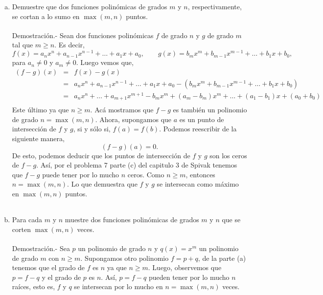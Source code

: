 \begin{enumerate}[\bfseries 1.]
\begin{enumerate}[(a)]
	    \item Demuestre que dos funciones polinómicas de grados $m$ y $n$, respectivamente, se cortan a lo sumo en $\max(m,n)$ puntos.\\\\
		Demostración.-\; Sean dos funciones polinómicas $f$ de grado $n$ y $g$ de grado $m$ tal que $m\geq n$. Es decir,
		$$f(x)=a_nx^n+a_{n-1}x^{n-1}+\ldots + a_1x+a_0, \qquad g(x)=b_mx^m + b_{m-1}x^{m-1}+\ldots + b_1x+b_0,$$
		para $a_n\neq 0$ y $a_m\neq 0$. Luego vemos que,
		$$\begin{array}{rcl}
		    (f-g)(x) &=& f(x)-g(x)\\
			     &=& a_nx^n+a_{n-1}x^{n-1}+\ldots + a_1x+a_0 - \left(b_mx^m + b_{m-1}x^{m-1}+\ldots + b_1x+b_0\right)\\
			     &=& a_nx^n + \ldots +a_{m+1}x^{m+1} - b_mx^m + (a_m-b_m)x^m+\ldots + (a_1-b_1)x+(a_0+b_0)\\
		\end{array}$$
		Este  último ya que $n\geq m.$ Acá mostramos que $f-g$ es también un polinomio de grado $n=\max(m,n)$. Ahora, supongamos que $a$ es un punto de intersección de $f$ y $g$, si y sólo si, $f(a)=f(b)$. Podemos reescribir de la siguiente manera,
		$$(f-g)(a)=0.$$
		De esto, podemos deducir que los puntos de intersección de $f$ y $g$ son los ceros de $f-g$. Así, por el problema 7 parte (c) del capitulo 3 de Spivak tenemos que $f-g$ puede tener por lo mucho $n$ ceros. Como $n\geq m$, entonces $n=\max(m,n)$. Lo que demuestra que $f$ y $g$ se intersecan como máximo en $\max(m,n)$ puntos.\\\\
		

	    \item Para cada $m$ y $n$ muestre dos funciones polinómicas de grados $m$ y $n$ que se corten $\max(m,n)$ veces.\\\\
		Demostración.-\; Sea $p$ un polinomio de grado $n$ y $q(x)=x^m$ un polinomio de grado $m$ con $n\geq m$. Supongamos otro polinomio $f=p+q$, de la parte (a) tenemos que el grado de $f$ es $n$ ya que $n\geq m$. Luego, observemos que $p=f-q$ y el grado de $p$ es $n$. Así, $p=f-q$ pueden tener por lo mucho $n$ raíces, esto es, $f$ y $q$ se intersecan por lo mucho en $n=\max(m,n)$ veces.\\\\

	\end{enumerate}


\end{enumerate}
